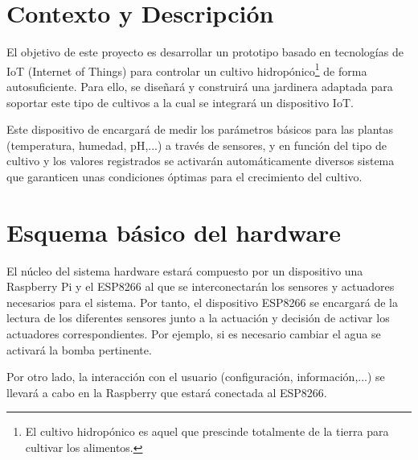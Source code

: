 \documentclass[12pt,a4paper,titlepage,oneside]{report}
\title{\titulo}
\author{\autor}
\begin{document}



\tableofcontents
\listoffigures

\chapter{Contexto y Descripción}
	El objetivo de este proyecto es desarrollar un prototipo basado en tecnologías de IoT (Internet of Things) para controlar un cultivo hidropónico\footnote[1]{El cultivo hidropónico es aquel que prescinde totalmente de la tierra para cultivar los alimentos.\cite{ecoinventos_2019}} de forma autosuficiente. Para ello, se diseñará y construirá una jardinera adaptada para soportar este tipo de cultivos a la cual se integrará un  dispositivo IoT. 


	Este dispositivo de encargará de medir los parámetros básicos para las plantas (temperatura, humedad, pH,...) a través de sensores, y en función del tipo de cultivo y los valores registrados se activarán automáticamente diversos sistema que garanticen unas condiciones óptimas para el crecimiento del cultivo.



\chapter{Esquema básico del hardware}

	El núcleo del sistema hardware estará compuesto por un dispositivo una Raspberry Pi y el ESP8266 al que se interconectarán los sensores y actuadores necesarios para el sistema. Por tanto, el dispositivo ESP8266 se encargará de la lectura de los diferentes sensores junto a la actuación y decisión de activar los actuadores correspondientes. Por ejemplo, si es necesario cambiar el agua se activará la bomba pertinente.

	Por otro lado, la interacción con el usuario (configuración, información,...) se llevará a cabo en la Raspberry que estará conectada al ESP8266. \cite{ruiz}
	
\end{document}
